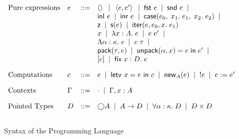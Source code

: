 \begin{figure}
\begin{displaymath}
  \begin{array}{llcl}
    \mbox{Pure expressions} & 
     e & ::= & 
         \left<\right> \;\;|\;\;
         \left<{e},{e'}\right> \;\;|\;\;
         \mbox{\textsf{{fst }}} e \;\;|\;\;
         \mbox{\textsf{{snd }}} e \;\;|\;\; 
\\
     &&& \mbox{\textsf{{inl }}}e \;\;|\;\;
         \mbox{\textsf{{inr }}}e \;\;|\;\;
         \mbox{\textsf{{case}}}(e_0,\; {x_1}.\; e_1,\; {x_2}.\; e_2) \;\;|\;\;
\\
     &&& \mbox{\textsf{{z}}} \;\;|\;\; 
         \mbox{\textsf{{s}}}(e) \;\;|\;\; 
         \mbox{\textsf{{iter}}}(e, {e_0}, {x}.\; {e_1})
\\ 
     &&& x \;\;|\;\; \lambda x:A.\;e \;\;|\;\; e\;e' \;\;|\;\;
\\ 
     &&& \Lambda \alpha:\kappa.\;e \;\;|\;\; e\;\tau \;\;|\;\;
\\ 
     &&& \mbox{\textsf{{pack}}}({\tau}, {e}) \;\;|\;\; \mbox{\textsf{{unpack}}}({\alpha}, {x}) = {e} \;\mbox{\textsf{{in}}}\;{e'} \;\;|\;\;
\\
     &&& [c] \;\;|\;\; \mbox{\textsf{{fix}}}\;{x:D}.\;{e}
\\[1em]
  \mbox{Computations} & 
    c & ::= & e \;\;|\;\; \mbox{\textsf{{letv }}}x = e\mbox{\textsf{{ in }}}c \;\;|\;\;
              \mbox{\textsf{{new}}}_{A}(e) \;\;|\;\; !e \;\;|\;\; e := e'
\\[1em]
  \mbox{Contexts} & 
    \Gamma & ::= & \cdot \;\;|\;\; \Gamma, x:A 
\\[1em]
  \mbox{Pointed Types} & 
     D & ::= & \bigcirc{A} \;\;|\;\; A \to D \;\;|\;\; \forall \alpha:\kappa.\; D \;\;|\;\; D \times D 
\\[1em] 
  \end{array}
\end{displaymath}
\caption{Syntax of the Programming Language}
\label{lang-syntax}
\end{figure}


